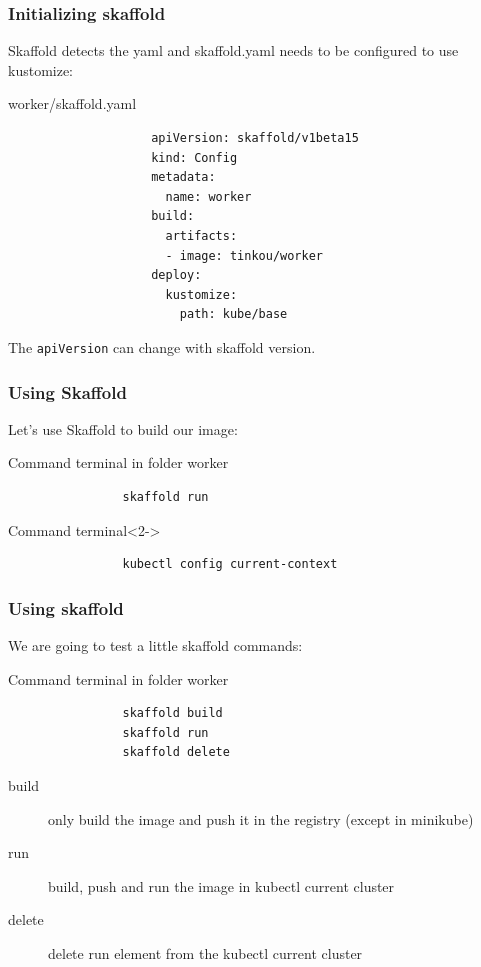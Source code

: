 	\begin{frame}[fragile]
		\frametitle{Initializing skaffold}

		Skaffold detects the yaml and skaffold.yaml needs to be configured to use kustomize:
		\begin{block}{worker/skaffold.yaml}
			\begin{footnotesize}
				\begin{verbatim}
					apiVersion: skaffold/v1beta15
					kind: Config
					metadata:
					  name: worker
					build:
					  artifacts:
					  - image: tinkou/worker
					deploy:
					  kustomize:
					    path: kube/base
				\end{verbatim}						
			\end{footnotesize}
		\end{block}
		The \verb!apiVersion! can change with skaffold version.
	\end{frame}
	
	\begin{frame}[fragile]
		\frametitle{Using Skaffold}
		
		Let's use Skaffold to build our image:
		\begin{block}{Command terminal in folder worker}
			\begin{verbatim}
				skaffold run
			\end{verbatim}
		\end{block}
		
		\bigskip
		

		\begin{block}{Command terminal}<2->
			\begin{verbatim}
				kubectl config current-context
			\end{verbatim}
		\end{block}				
	\end{frame}
	
	\begin{frame}[fragile]
		\frametitle{Using skaffold}
		
		We are going to test a little skaffold commands:
		\begin{block}{Command terminal in folder worker}
			\begin{verbatim}
				skaffold build
				skaffold run
				skaffold delete
			\end{verbatim}					
		\end{block}
		
		\begin{description}
			\item[build] only build the image and push it in the registry (except in minikube)
			\item[run] build, push and run the image in kubectl current cluster
			\item[delete] delete run element from the kubectl current cluster
		\end{description}
	
	\end{frame}
	

